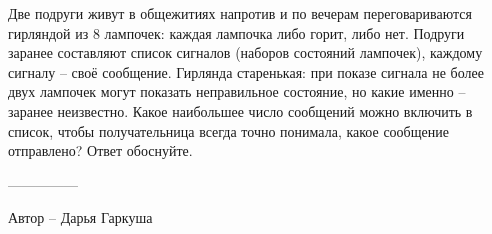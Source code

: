 \question
Две подруги живут в общежитиях напротив и по вечерам переговариваются гирляндой из $8$ лампочек: каждая лампочка либо горит, либо нет. Подруги заранее составляют список сигналов (наборов состояний лампочек), каждому сигналу -- своё сообщение. Гирлянда старенькая: при показе сигнала не более двух лампочек могут показать неправильное состояние, но какие именно -- заранее неизвестно. Какое наибольшее число сообщений можно включить в список, чтобы получательница всегда точно понимала, какое сообщение отправлено? Ответ обоснуйте.

---------------

Автор -- Дарья Гаркуша